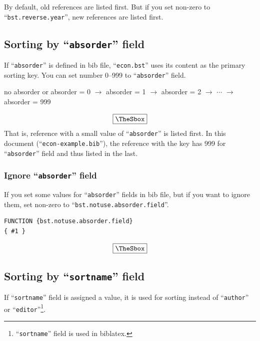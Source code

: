 \documentclass[10pt]{article}
\newenvironment{Frame}%
{\setlength{\fboxsep}{15pt}
\setlength{\mylength}{\linewidth}%
\addtolength{\mylength}{-2\fboxsep}%
\addtolength{\mylength}{-2\fboxrule}%
\Sbox
\minipage{\mylength}%
\setlength{\abovedisplayskip}{0pt}%
\setlength{\belowdisplayskip}{0pt}%
}%
{\endminipage\endSbox
\[\fbox{\TheSbox}\]}
\begin{document}
By default, old references are listed first.  But if you set non-zero to
``\texttt{bst.reverse.year}'', new references are listed first.

\subsection{Sorting by ``\texttt{absorder}'' field}

If ``\texttt{absorder}'' is defined in bib file,
``\texttt{econ.bst}'' uses its content as the primary sorting key.
You can set number 0--999 to ``\texttt{absorder}'' field.

\begin{Frame}
\begin{center}
 no absorder or absorder = 0  $\rightarrow$ absorder = 1 $\rightarrow$ absorder = 2
 $\rightarrow$ $\cdots$ $\rightarrow$ absorder = 999
\end{center}
\end{Frame}
That is, reference with a small value of ``\texttt{absorder}'' is listed
first.  In this document (``\texttt{econ-example.bib}''), the reference
with the key \citet{takeda10:_cge_analy_welfar_effec_trade} has 999 for
``\texttt{absorder}'' field and thus listed in the last.


\subsubsection{Ignore ``\texttt{absorder}'' field}

If you set some values for ``\texttt{absorder}'' fields in bib file,
but if you want to ignore them, set non-zero to
``\texttt{bst.notuse.absorder.field}''.
\begin{Frame}
\begin{verbatim}
FUNCTION {bst.notuse.absorder.field}
{ #1 }
\end{verbatim}
\end{Frame}

\subsection{Sorting by ``\texttt{sortname}'' field}

If ``\texttt{sortname}'' field is assigned a value, it is used for sorting
instead of ``\texttt{author}'' or
``\texttt{editor}''\footnote{``\texttt{sortname}'' field is used in biblatex.}.
\end{document}
